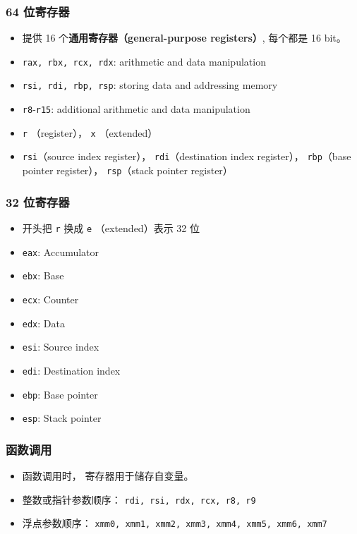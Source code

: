 \subsubsection{64 位寄存器}
\begin{itemize}
\item 提供 16 个\textbf{通用寄存器（general-purpose registers）}, 每个都是 16 bit。
\item \verb|rax, rbx, rcx, rdx|: arithmetic and data manipulation
\item \verb|rsi, rdi, rbp, rsp|: storing data and addressing memory
\item \verb|r8|-\verb|r15|: additional arithmetic and data manipulation
\item \verb|r| （register）， \verb|x| （extended）
\item \verb|rsi|（source index register）， \verb|rdi|（destination index register）， \verb|rbp|（base pointer register）， \verb|rsp|（stack pointer register）
\end{itemize}

\subsubsection{32 位寄存器}
\begin{itemize}
\item 开头把 \verb|r| 换成 \verb|e| （extended）表示 32 位
\item \verb|eax|: Accumulator
\item \verb|ebx|: Base
\item \verb|ecx|: Counter
\item \verb|edx|: Data
\item \verb|esi|: Source index
\item \verb|edi|: Destination index
\item \verb|ebp|: Base pointer
\item \verb|esp|: Stack pointer
\end{itemize}

\subsubsection{函数调用}
\begin{itemize}
\item 函数调用时， 寄存器用于储存自变量。
\item 整数或指针参数顺序： \verb|rdi, rsi, rdx, rcx, r8, r9|
\item 浮点参数顺序： \verb|xmm0, xmm1, xmm2, xmm3, xmm4, xmm5, xmm6, xmm7|
\end{itemize}


